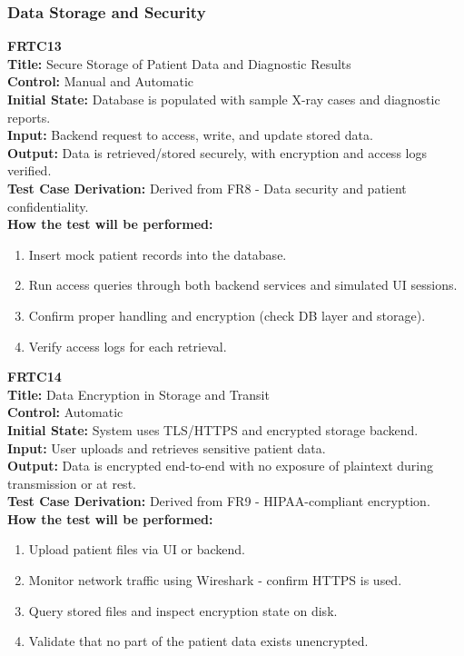 \documentclass[12pt, titlepage]{article}
\begin{document}
\vspace{1em}

\subsubsection{Data Storage and Security}

\textbf{FRTC13}\\
\textbf{Title:} Secure Storage of Patient Data and Diagnostic Results\\
\textbf{Control:} Manual and Automatic\\
\textbf{Initial State:} Database is populated with sample X-ray cases and diagnostic reports.\\
\textbf{Input:} Backend request to access, write, and update stored data.\\
\textbf{Output:} Data is retrieved/stored securely, with encryption and access logs verified.\\
\textbf{Test Case Derivation:} Derived from FR8 - Data security and patient confidentiality.\\
\textbf{How the test will be performed:}
\begin{enumerate}
  \item Insert mock patient records into the database.
  \item Run access queries through both backend services and simulated UI sessions.
  \item Confirm proper handling and encryption (check DB layer and storage).
  \item Verify access logs for each retrieval.
\end{enumerate}

\vspace{1em}

\textbf{FRTC14}\\
\textbf{Title:} Data Encryption in Storage and Transit\\
\textbf{Control:} Automatic\\
\textbf{Initial State:} System uses TLS/HTTPS and encrypted storage backend.\\
\textbf{Input:} User uploads and retrieves sensitive patient data.\\
\textbf{Output:} Data is encrypted end-to-end with no exposure of plaintext during transmission or at rest.\\
\textbf{Test Case Derivation:} Derived from FR9 - HIPAA-compliant encryption.\\
\textbf{How the test will be performed:}
\begin{enumerate}
  \item Upload patient files via UI or backend.
  \item Monitor network traffic using Wireshark - confirm HTTPS is used.
  \item Query stored files and inspect encryption state on disk.
  \item Validate that no part of the patient data exists unencrypted.
\end{enumerate}
\end{document}
